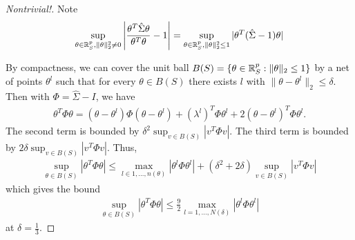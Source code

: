 \begin{proof}[Nontrivial!]
  Note
  \begin{align}
    \label{eq:73}
    \sup_{\theta \in \mathbb{R}_{S}^{p}, \| \theta \|_{2}^{2} \neq 0} \left|
      \frac{\theta^{T} \hat \Sigma \theta}{\theta^{T} \theta} - 1
    \right| = \sup_{\theta \in \mathbb{R}^{p}_{S}, \| \theta \|_{2}^{2} \leq
      1}  | \theta^{T} (\hat \Sigma - 1) \theta|
  \end{align}

  By compactness, we can cover the unit ball $B(S) = \{ \theta \in
  \mathbb{R}^{p}_{S} : \| \theta \|_{2} \leq 1 \}$ by a net of points
  $\theta^{l}$  such that for every $\theta \in B(S)$ there exists $l$
  with $\| \theta - \theta^{l}\|_{2} \leq \delta$.  Then with $\Phi =
  \hat \Sigma - I$, we have
  \begin{align}
    \label{eq:74}
    \theta^{T}  \Phi \theta = (\theta - \theta^{l}) \Phi (\theta -
    \theta^{l}) + (\lambda^{l})^{T} \Phi \theta^{l} + 2(\theta -
    \theta^{l})^{T} \Phi \theta^{l}.
  \end{align}
  The second term is bounded by $\delta^{2} \sup_{v \in B(S)}  |v^{T}
  \Phi v|$. The third term is bounded by $2 \delta \sup_{v \in B(S)} |
  v^{T} \Phi v |$.  Thus,
  \begin{align}
    \label{eq:75}
    \sup_{\theta \in B(S)} | \theta^{T} \Phi \theta | \leq \max_{l \in
    1, \dots, n(\theta)} | \theta^{l} \Phi \theta^{l}| + (\delta^{2} +
  2 \delta)\sup_{v \in B(S)} |v^{T} \Phi v |
  \end{align} which gives the bound
  \begin{align}
    \label{eq:76}
    \sup_{\theta \in B(S)} | \theta^{T} \Phi \theta | \leq \frac{9}{2}
    \max_{l = 1, \dots, N(\delta)} |\theta^{l} \Phi \theta^{l}|
  \end{align} at $\delta = \frac{1}{3}$.


\end{proof}
